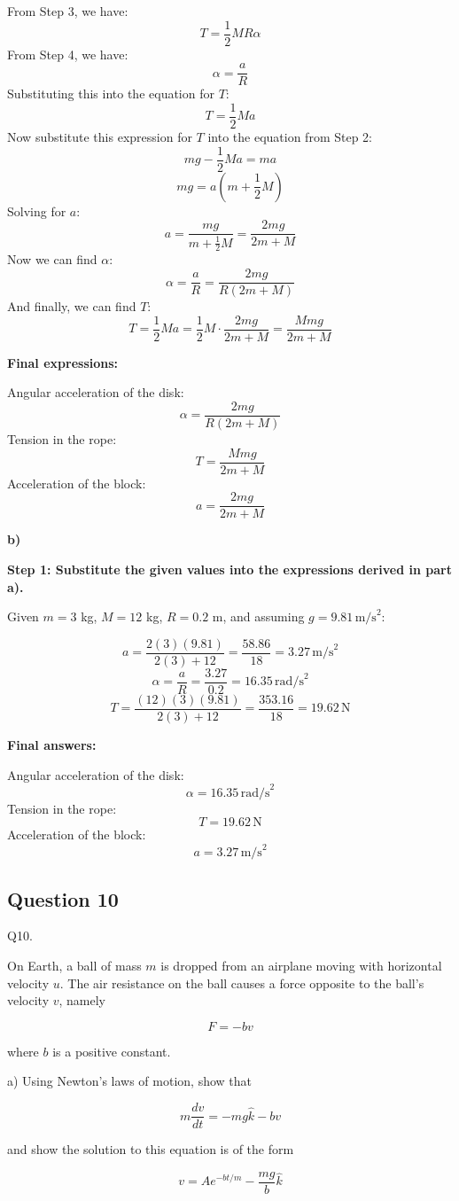 \documentclass{article}
\begin{document}
From Step 3, we have:
\[T = \frac{1}{2}MR\alpha\]
From Step 4, we have:
\[\alpha = \frac{a}{R}\]
Substituting this into the equation for $T$:
\[T = \frac{1}{2}Ma\]
Now substitute this expression for $T$ into the equation from Step 2:
\[mg - \frac{1}{2}Ma = ma\]
\[mg = a(m + \frac{1}{2}M)\]
Solving for $a$:
\[a = \frac{mg}{m + \frac{1}{2}M} = \frac{2mg}{2m + M}\]
Now we can find $\alpha$:
\[\alpha = \frac{a}{R} = \frac{2mg}{R(2m + M)}\]
And finally, we can find $T$:
\[T = \frac{1}{2}Ma = \frac{1}{2}M \cdot \frac{2mg}{2m + M} = \frac{Mmg}{2m + M}\]

\textbf{Final expressions:}

Angular acceleration of the disk: \[\alpha = \frac{2mg}{R(2m+M)}\]
Tension in the rope: \[T = \frac{Mmg}{2m + M}\]
Acceleration of the block: \[a = \frac{2mg}{2m + M}\]

\textbf{b)}

\textbf{Step 1: Substitute the given values into the expressions derived in part a).}

Given $m = 3$ kg, $M = 12$ kg, $R = 0.2$ m, and assuming $g = 9.81 \, \text{m/s}^2$:

\[a = \frac{2(3)(9.81)}{2(3) + 12} = \frac{58.86}{18} = 3.27 \, \text{m/s}^2\]
\[\alpha = \frac{a}{R} = \frac{3.27}{0.2} = 16.35 \, \text{rad/s}^2\]
\[T = \frac{(12)(3)(9.81)}{2(3) + 12} = \frac{353.16}{18} = 19.62 \, \text{N}\]

\textbf{Final answers:}

Angular acceleration of the disk: \[\alpha = 16.35 \, \text{rad/s}^2\]
Tension in the rope: \[T = 19.62 \, \text{N}\]
Acceleration of the block: \[a = 3.27 \, \text{m/s}^2\]

\subsection{Question 10}
Q10.

On Earth, a ball of mass $m$ is dropped from an airplane moving with horizontal velocity $u$. The
air resistance on the ball causes a force opposite to the ball's velocity $v$, namely

$$F = -bv$$

where $b$ is a positive constant.

a) Using Newton's laws of motion, show that

$$m\frac{dv}{dt} = -mg\hat{k} - bv$$

and show the solution to this equation is of the form

$$v = Ae^{-bt/m} - \frac{mg}{b}\hat{k}$$
\end{document}
